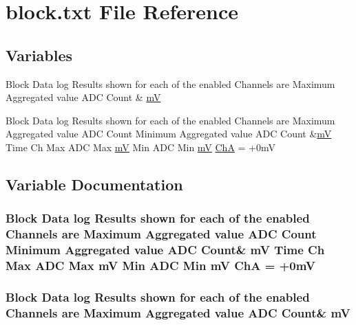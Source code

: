 \hypertarget{block_8txt}{}\section{block.\+txt File Reference}
\label{block_8txt}
\subsection*{Variables}
\begin{DoxyCompactItemize}
\item 
Block Data log Results shown for each of the enabled Channels are Maximum Aggregated value A\+DC Count \& \hyperlink{block_8txt_a68802ea32dd388f24faab004fa749a74}{mV}
\item 
Block Data log Results shown for each of the enabled Channels are Maximum Aggregated value A\+DC Count Minimum Aggregated value A\+DC Count \&\hyperlink{block_8txt_a68802ea32dd388f24faab004fa749a74}{mV} Time Ch Max A\+DC Max \hyperlink{block_8txt_a68802ea32dd388f24faab004fa749a74}{mV} Min A\+DC Min \hyperlink{block_8txt_a68802ea32dd388f24faab004fa749a74}{mV} \hyperlink{block_8txt_a96b9bc0401b42a5d6337de22a8779596}{ChA} = +0mV
\end{DoxyCompactItemize}


\subsection{Variable Documentation}
\subsubsection[{\texorpdfstring{ChA}{ChA}}]{\setlength{\rightskip}{0pt plus 5cm}Block Data log Results shown for each of the enabled Channels are Maximum Aggregated value A\+DC Count Minimum Aggregated value A\+DC Count\& {\bf mV} Time Ch Max A\+DC Max {\bf mV} Min A\+DC Min {\bf mV} ChA = +0mV}\hypertarget{block_8txt_a96b9bc0401b42a5d6337de22a8779596}{}\label{block_8txt_a96b9bc0401b42a5d6337de22a8779596}
\subsubsection[{\texorpdfstring{mV}{mV}}]{\setlength{\rightskip}{0pt plus 5cm}Block Data log Results shown for each of the enabled Channels are Maximum Aggregated value A\+DC Count\& mV}\hypertarget{block_8txt_a68802ea32dd388f24faab004fa749a74}{}\label{block_8txt_a68802ea32dd388f24faab004fa749a74}
